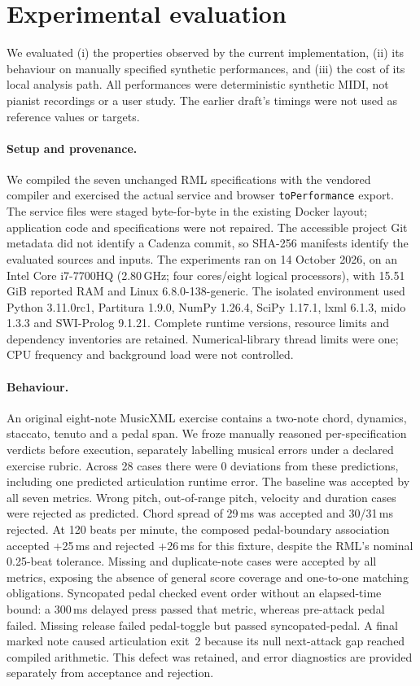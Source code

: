 \section{Experimental evaluation}
\label{sec:evaluation}
We evaluated (i) the properties observed by the current implementation,
(ii) its behaviour on manually specified synthetic performances, and
(iii) the cost of its local analysis path. All performances were deterministic
synthetic MIDI, not pianist recordings or a user study. The earlier draft's
timings were not used as reference values or targets.

\paragraph{Setup and provenance.}
We compiled the seven unchanged RML specifications with the vendored compiler
and exercised the actual service and browser \texttt{toPerformance} export.
The service files were staged byte-for-byte in the existing Docker layout;
application code and specifications were not repaired. The accessible project
Git metadata did not identify a Cadenza commit, so SHA-256 manifests identify
the evaluated sources and inputs. The experiments ran on 14 October 2026,
on an Intel Core i7-7700HQ (2.80\,GHz; four cores/eight logical processors),
with 15.51\,GiB reported RAM and Linux 6.8.0-138-generic.
The isolated environment used Python 3.11.0rc1, Partitura 1.9.0,
NumPy 1.26.4, SciPy 1.17.1, lxml 6.1.3, mido 1.3.3 and SWI-Prolog 9.1.21.
Complete runtime versions, resource limits and dependency inventories are retained.
Numerical-library thread limits were one; CPU frequency and background load
were not controlled.

\paragraph{Behaviour.}
An original eight-note MusicXML exercise contains a two-note chord, dynamics,
staccato, tenuto and a pedal span. We froze manually reasoned per-specification
verdicts before execution, separately labelling musical errors under a declared
exercise rubric. Across 28 cases there were 0 deviations from these predictions,
including one predicted articulation runtime error. The baseline was accepted
by all seven metrics. Wrong pitch, out-of-range pitch, velocity and duration
cases were rejected as predicted. Chord spread of 29\,ms was accepted and
30/31\,ms rejected. At 120 beats per minute, the composed pedal-boundary
association accepted +25\,ms and rejected +26\,ms for this fixture, despite
the RML's nominal 0.25-beat tolerance. Missing and duplicate-note cases were
accepted by all metrics, exposing the absence of general score coverage and
one-to-one matching obligations. Syncopated pedal checked event order without
an elapsed-time bound: a 300\,ms delayed press passed that metric, whereas
pre-attack pedal failed. Missing release failed pedal-toggle but passed
syncopated-pedal. A final marked note caused articulation exit~2 because its
null next-attack gap reached compiled arithmetic. This defect was retained,
and error diagnostics are provided separately from acceptance and rejection.

